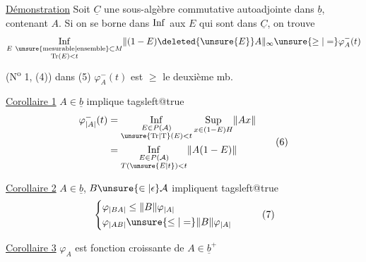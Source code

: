 \uline{Démonstration} Soit $\underline C$  une sous-algèbre commutative autoadjointe  dans $\underline b$, contenant $A$. Si on se borne dans  $\mathop{\rm Inf}$ aux $E$ qui sont dans $\underline C$, on trouve
\[
\mathop{\rm Inf}\limits_{\substack{E\ \text{\unsure{mesurable|ensemble}}\subset M\\\mathrm{Tr}(E)<t}}
\lVert(1-E)\deleted{\unsure{E}}A\rVert_\infty\unsure{\geq|=}\varphi_A^-(t)
\]
(N\textsuperscript{o} 1,  (4))   dans (5) $\varphi^-_A(t)$ est $\geq$ le deuxième mb.

 \uline{Corollaire 1} $A\in\underline b$ implique
\begingroup\csname tagsleft@true\endcsname
\[
\begin{aligned}
\varphi^-_{\lvert A\rvert}(t)&=\mathop{\rm Inf}\limits_{\substack{E\in P(\mathcal A)\\\unsure{\mathrm{Tr}|\mathrm T}(E)<t}}
\mathop{\rm Sup}\limits_{x\in(1-E)H}\lVert Ax\rVert\\
&=\mathop{\rm Inf}\limits_{\substack{E\in P(\mathcal A)\\T(\unsure{E|t})<t}}\lVert A(1-E)\rVert
\end{aligned}\tag*{(6)}
\]
\endgroup

\uline{Corollaire 2} $A\in\underline b$, $B\unsure{\in|\epsilon}\mathcal A$ impliquent
\begingroup\csname tagsleft@true\endcsname
\[
\begin{aligned}
&\left\{\begin{aligned}
\varphi_{\lvert BA\rvert}&\leq\lVert B\rVert\varphi_{\lvert A\rvert}\\
\varphi_{\lvert AB\rvert}&\unsure{\leq|=}\lVert B\rVert\varphi_{\lvert A\rvert}
\end{aligned}\right.
\end{aligned}\tag*{(7)}
\]
\endgroup

\uline{Corollaire 3} $\varphi_A$ est fonction croissante de $A\in\underline b^+$

